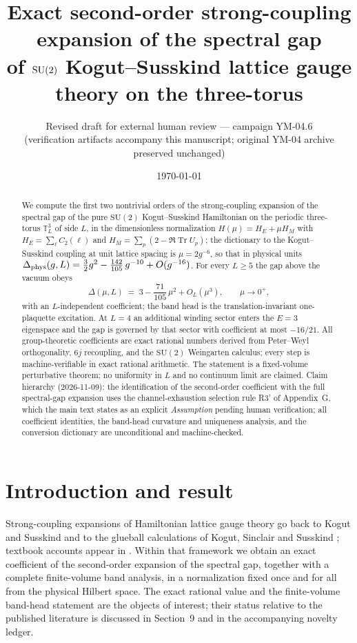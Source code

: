 \documentclass[11pt]{article}
\title{\bf Exact second-order strong-coupling expansion of the spectral gap\\
of $\G$ Kogut--Susskind lattice gauge theory on the three-torus}
\author{Revised draft for external human review --- campaign YM-04.6\\
\small (verification artifacts accompany this manuscript; original YM-04 archive preserved unchanged)}
\date{\today}
\newcommand{\Tr}{\operatorname{Tr}}
\newcommand{\G}{{\mathrm{SU}}(2)}
\begin{document}
\maketitle

\begin{abstract}
We compute the first two nontrivial orders of the strong-coupling expansion of
the spectral gap of the pure $\G$ Kogut--Susskind Hamiltonian on the periodic
three-torus $\mathbb T_L^3$ of side $L$, in the dimensionless normalization
$H(\mu)=H_E+\mu H_M$ with $H_E=\sum_{\ell}C_2(\ell)$ and
$H_M=\sum_p(2-\Re\Tr U_p)$; the dictionary to the Kogut--Susskind coupling at
unit lattice spacing is $\mu=2g^{-6}$, so that in physical units
$\Delta_{\rm phys}(g,L)=\tfrac32 g^{2}-\tfrac{142}{105}\,g^{-10}+O(g^{-16})$. For every $L\ge 5$ the gap above the vacuum obeys
\[
\Delta(\mu,L)\;=\;3-\frac{71}{105}\,\mu^2+O_L(\mu^3),\qquad \mu\to 0^+,
\]
with an $L$-independent coefficient; the band head is the translation-invariant
one-plaquette excitation. At $L=4$ an additional winding sector enters the
$E=3$ eigenspace and the gap is governed by that sector with coefficient at
most $-16/21$. All group-theoretic coefficients are exact rational numbers
derived from Peter--Weyl orthogonality, $6j$ recoupling, and the
$\G$ Weingarten calculus; every step is machine-verifiable in exact rational
arithmetic. The statement is a fixed-volume perturbative theorem; no
uniformity in $L$ and no continuum limit are claimed. Claim hierarchy
(2026-11-09): the identification of the second-order coefficient with the
full spectral-gap expansion uses the channel-exhaustion selection rule R3'
of Appendix~G, which the main text states as an explicit \emph{Assumption}
pending human verification; all coefficient identities, the band-head
curvature and uniqueness analysis, and the conversion dictionary are
unconditional and machine-checked.
\end{abstract}

\section{Introduction and result}
Strong-coupling expansions of Hamiltonian lattice gauge theory go back to
Kogut and Susskind \cite{KS75} and to the glueball calculations of Kogut,
Sinclair and Susskind \cite{KSS76}; textbook accounts appear in
\cite{MM94,DZ83}. Within that framework we obtain an exact coefficient of the
second-order expansion of the spectral gap, together with a complete
finite-volume band analysis, in a normalization fixed once and for all from
the physical Hilbert space. The exact rational value and the finite-volume
band-head statement are the objects of interest; their status relative to the
published literature is discussed in Section~9 and in the accompanying
novelty ledger.
\end{document}
